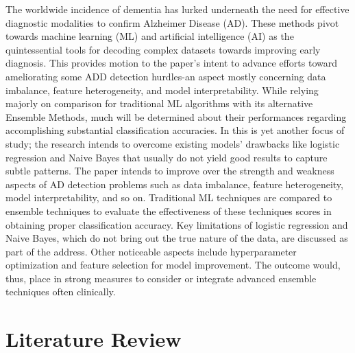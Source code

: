 \documentclass[conference]{IEEEtran} %
\begin{document}
The worldwide incidence of dementia has lurked underneath the need for effective diagnostic modalities to confirm Alzheimer Disease (AD). These methods pivot towards machine learning (ML) and artificial intelligence (AI) as the quintessential tools for decoding complex datasets towards improving early diagnosis. This provides motion to the paper's intent to advance efforts toward ameliorating some ADD detection hurdles-an aspect mostly concerning data imbalance, feature heterogeneity, and model interpretability. While relying majorly on comparison for traditional ML algorithms with its alternative Ensemble Methods, much will be determined about their performances regarding accomplishing substantial classification accuracies. In this is yet another focus of study; the research intends to overcome existing models' drawbacks like logistic regression and Naive Bayes that usually do not yield good results to capture subtle patterns. The paper intends to improve over the strength and weakness aspects of AD detection problems such as data imbalance, feature heterogeneity, model interpretability, and so on. Traditional ML techniques are compared to ensemble techniques to evaluate the effectiveness of these techniques scores in obtaining proper classification accuracy. Key limitations of logistic regression and Naive Bayes, which do not bring out the true nature of the data, are discussed as part of the address. Other noticeable aspects include hyperparameter optimization and feature selection for model improvement. The outcome would, thus, place in strong measures to consider or integrate advanced ensemble techniques often clinically.

\section{Literature Review}
\end{document}
